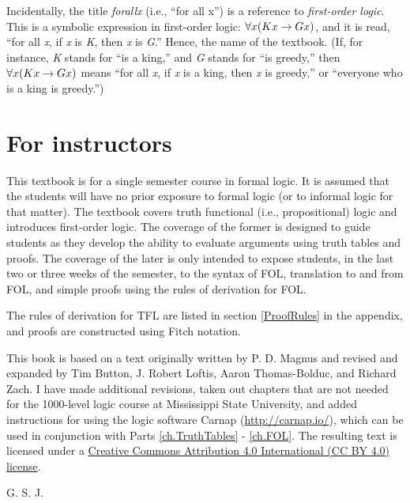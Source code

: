 Incidentally, the title \textit{forall\hspace{.10em}x} (i.e., ``for all x'') is a reference to \textit{first-order logic}. This is a symbolic expression in first-order logic: $\forall x(Kx \rightarrow Gx)$, and it is read, “for all \textit{x}, if \textit{x} is \textit{K}, then \textit{x} is \textit{G}.” Hence, the name of the textbook. (If, for instance, \textit{K} stands for ``is a king,'' and \textit{G} stands for ``is greedy,'' then $\forall x(Kx \rightarrow Gx)$ means ``for all \textit{x}, if \textit{x} is a king, then \textit{x} is greedy,'' or ``everyone who is a king is greedy.'') 


\section{For instructors}

This textbook is for a single semester course in formal logic. It is assumed that the students will have no prior exposure to formal logic (or to informal logic for that matter). The textbook covers truth functional (i.e., propositional) logic and introduces first-order logic. The coverage of the former is designed to guide students as they develop the ability to evaluate arguments using truth tables and proofs. The coverage of the later is only intended to expose students, in the last two or three weeks of the semester, to the syntax of FOL, translation to and from FOL, and simple proofs using the rules of derivation for FOL. 

The rules of derivation for TFL are listed in section \ref{ProofRules} in the appendix, and proofs are constructed using Fitch notation.

This book is based on a text originally written by P. D. Magnus and revised and expanded by Tim Button, J. Robert Loftis, Aaron Thomas-Bolduc, and Richard Zach. I have made additional revisions, taken out chapters that are not needed for the 1000-level logic course at Mississippi State University, and added instructions for using the logic software Carnap (\href{http://carnap.io/}{http://carnap.io/}), which can be used in conjunction with Parts \ref{ch.TruthTables} - \ref{ch.FOL}. The resulting text is licensed under a \href{https://creativecommons.org/licenses/by/4.0/}{Creative Commons Attribution 4.0 International (CC BY 4.0) license}. 

\smallskip
\hspace*{\fill} G. S. J.

 